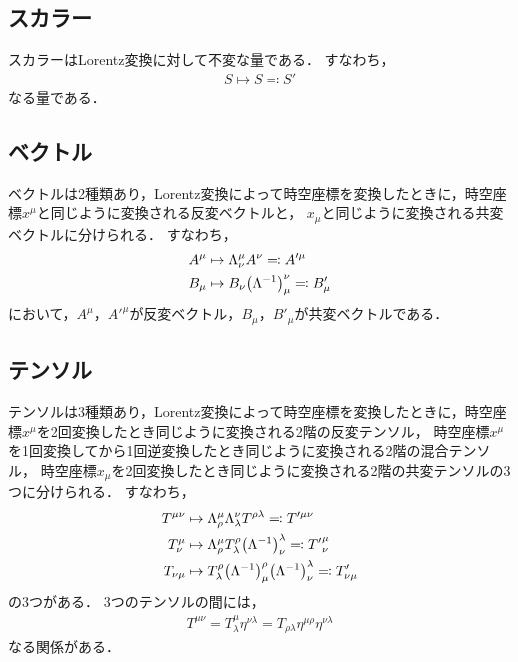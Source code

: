 \documentclass{report}
\begin{document}
    \subsection{スカラー}
      スカラーはLorentz変換に対して不変な量である．
      すなわち，
      \begin{align}
        S \mapsto S \eqqcolon S'
      \end{align}
      なる量である．
    \subsection{ベクトル}
      ベクトルは2種類あり，Lorentz変換によって時空座標を変換したときに，時空座標$x^{\mu}$と同じように変換される反変ベクトルと，
      $x_{\mu}$と同じように変換される共変ベクトルに分けられる．
      すなわち，
      \begin{align}
        A^{\mu} &\mapsto \Lambda_{\nu}^{\mu}A^{\nu} \eqqcolon A'^{\mu} \\ 
        B_{\mu} &\mapsto B_{\nu}\qty(\Lambda^{-1})_{\mu}^{\nu} \eqqcolon B'_{\mu}
      \end{align}
      において，$A^{\mu}$，$A'^{\mu}$が反変ベクトル，$B_{\mu}$，$B'_{\mu}$が共変ベクトルである．
    \subsection{テンソル}
      テンソルは3種類あり，Lorentz変換によって時空座標を変換したときに，時空座標$x^{\mu}$を2回変換したとき同じように変換される2階の反変テンソル，
      時空座標$x^{\mu}$を1回変換してから1回逆変換したとき同じように変換される2階の混合テンソル，
      時空座標$x_{\mu}$を2回変換したとき同じように変換される2階の共変テンソルの3つに分けられる．
      すなわち，
      \begin{align}
        T^{\mu\nu} &\mapsto \Lambda_{\rho}^{\mu}\Lambda_{\lambda}^{\nu}T^{\rho\lambda} \eqqcolon T'^{\mu\nu} \\ 
        T_{\nu}^{\mu} &\mapsto \Lambda_{\rho}^{\mu}T_{\lambda}^{\rho}\qty(\Lambda^{-1})_{\nu}^{\lambda} \eqqcolon {T'}_{\nu}^{\mu} \\ 
        T_{\nu\mu} &\mapsto T_{\lambda}^{\rho}\qty(\Lambda^{-1})_{\mu}^{\rho}\qty(\Lambda^{-1})_{\nu}^{\lambda} \eqqcolon T'_{\nu\mu}
      \end{align}
      の3つがある．
      3つのテンソルの間には，
      \begin{align}
        T^{\mu\nu} = T_{\lambda}^{\mu}\eta^{\nu\lambda} = T_{\rho\lambda}\eta^{\mu\rho}\eta^{\nu\lambda}
      \end{align}
      なる関係がある．
\end{document}
